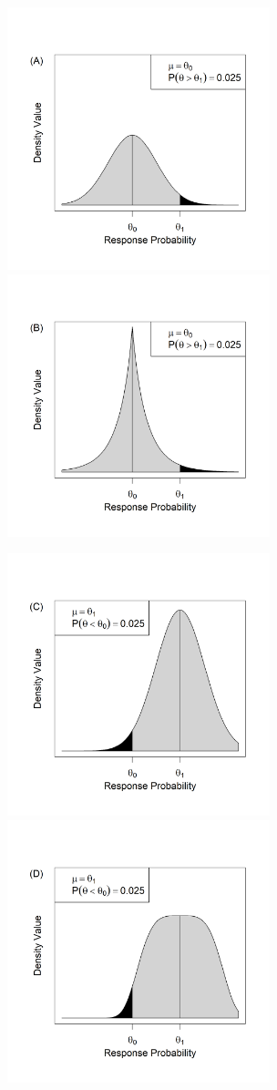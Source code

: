 \documentclass[12pt]{article}
\begin{document}
\begin{figure}\begin{center}
\includegraphics[width=3in]{./FIGURES/figure1a.png}
\includegraphics[width=3in]{./FIGURES/figure1b.png}

\includegraphics[width=3in]{./FIGURES/figure1c.png}
\includegraphics[width=3in]{./FIGURES/figure1d.png}


\end{center}
\end{figure}
\end{document}
